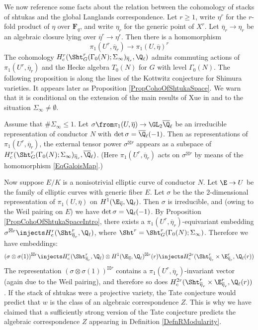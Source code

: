 \documentclass{article}
\def\F{\mathbf{F}}
\begin{document}
We now reference some facts about the relation between the cohomology of stacks of shtukas and the global Langlands correspondence.  Let $r\geq 1$, write $\eta^r$ for the $r$-fold product of $\eta$ over $\F_q$, and write $\eta_r$ for the generic point of $X^r$.   Let $\overline{\eta}_r\to\eta_r$ be an algebraic closure lying over $\overline{\eta}^r\to \eta^r$. Then there is a homomorphism 
\begin{equation}
\label{EqGaloisMap}
\pi_1(U^r,\overline{\eta}_r) \to \pi_1(U,\overline{\eta})^r
\end{equation}
The cohomology $H^r_c(\Sht^r_G(\Gamma_0(N);\Sigma_\infty)_{\overline{\eta}_r},\Q_\ell)$ admits commuting actions of $\pi_1(U^r,\overline{\eta}_r)$ and the Hecke algebra $T_0(N)$ for $G$ with level $\Gamma_0(N)$.   The following proposition is along the lines of the Kottwitz conjecture for Shimura varieties.   It appears later as Proposition \ref{PropCohoOfShtukaSpace}.  We warn that it is conditional on the extension of the main results of Xue in \cite{Xue} and \cite{XueFiniteness} to the situation $\Sigma_\infty\neq \emptyset$.  
\begin{prop}  
\label{PropCohoOfShtukaSpaceIntro}  Assume that $\#\Sigma_\infty\leq 1$.  Let $\sigma\from \pi_1(U,\overline{\eta})\to \GL_2\overline{\Q}_\ell$ be an irreducible representation of conductor $N$ with $\det \sigma=\overline{\Q}_\ell(-1)$.   Then as representations of $\pi_1(U^r,\overline{\eta}_r)$, the external tensor power $\sigma^{\boxtimes r}$ appears as a 
subspace of $H^r_c(\Sht^r_G(\Gamma_0(N);\Sigma_\infty)_{\overline{\eta}_r},\overline{\Q}_{\ell})$.   (Here $\pi_1(U^r,\overline{\eta}_r)$ acts on $\sigma^{\boxtimes r}$ by means of the homomorphism \eqref{EqGaloisMap}.)
\end{prop}

 Now suppose $E/K$ is a nonisotrivial elliptic curve of conductor $N$.  Let $\E\to U$ be the family of elliptic curves with generic fiber $E$.    Let $\sigma$ be the the 2-dimensional representation of $\pi_1(U,\overline{\eta})$ on $H^1(\E_{\overline{\eta}},\Q_\ell)$.   Then $\sigma$ is irreducible, and (owing to the Weil pairing on $E$) we have $\det \sigma=\Q_\ell(-1)$.  By Proposition \ref{PropCohoOfShtukaSpaceIntro}, there exists a $\pi_1(U^r,\overline{\eta}_r)$-equivariant embedding $\sigma^{\boxtimes r}\injects H^r_c(\Sht^r_{\overline{\eta}_r},\Q_\ell)$, where $\Sht^r=\Sht_G^r(\Gamma_0(N);\Sigma_\infty)$.   Therefore we have embeddings:
 \[ (\sigma\otimes \sigma(1))^{\boxtimes r} \injects 
 H^r_c(\Sht^r_{\overline{\eta}_r},\Q_\ell) \otimes H^1(\E_{\overline{\eta}},\Q_\ell)^{\boxtimes r}(r) 
\injects
H^{2r}_c(\Sht^r_{\overline{\eta}_r}\times \E^r_{\overline{\eta}_r},\Q_\ell(r))
\]
The representation $(\sigma\otimes\sigma(1))^{\boxtimes r}$ contains a $\pi_1(U^r,\overline{\eta}_r)$-invariant vector (again due to the Weil pairing), and therefore so does $H^{2r}_c(\Sht^r_{\overline{\eta}_r}\times \E^r_{\overline{\eta}_r},\Q_\ell(r))$. If the stack of shtukas were a projective variety, the Tate conjecture would predict that $w$ is the class of an algebraic correspondence $Z$.  This is why we have claimed that a sufficiently strong version of the Tate conjecture predicts the algebraic correspondence $Z$ appearing in Definition \ref{DefnRModularity}.
\end{document}
